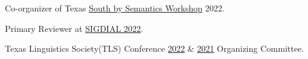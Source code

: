 Co-organizer of Texas \href{https://sites.google.com/utexas.edu/sxsw}{South by Semantics Workshop} 2022. 

Primary Reviewer at \href{https://2022.sigdial.org}{SIGDIAL 2022}.

Texas Linguistics Society(TLS) Conference \href{http://tls.ling.utexas.edu/}{2022} \& \href{http://tls.ling.utexas.edu/2021/}{2021} Organizing Committee.